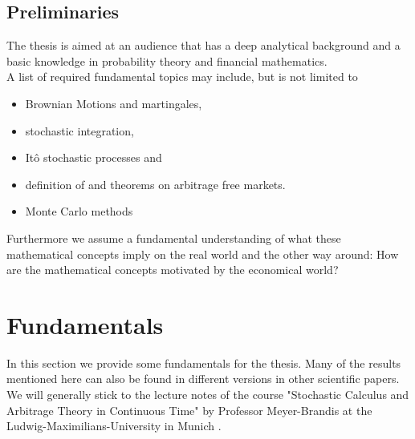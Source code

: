 \documentclass[12pt]{article}
\begin{document}
	
	\subsection{Preliminaries}
	The thesis is aimed at an audience that has a deep analytical background and a basic knowledge in probability theory and financial mathematics.\\
	A list of required fundamental topics may include, but is not limited to
	\begin{itemize}
		\item Brownian Motions and martingales,
		\item stochastic integration,
		\item Itô stochastic processes and
		\item definition of and theorems on arbitrage free markets.
		\item Monte Carlo methods
	\end{itemize}
	Furthermore we assume a fundamental understanding of what these mathematical concepts imply on the real world and the other way around: How are the mathematical concepts motivated by the economical world?
	
	
	
	
	
	
	
	\pagebreak
	\section{Fundamentals}\label{sec:Fundamentals}
	In this section we provide some fundamentals for the thesis. Many of the results mentioned here can also be found in different versions in other scientific papers. We will generally stick to the lecture notes of the course "Stochastic Calculus and Arbitrage Theory in Continuous Time" by Professor Meyer-Brandis at the Ludwig-Maximilians-University in Munich \cite{fima2Lecture}.
	
\end{document}
